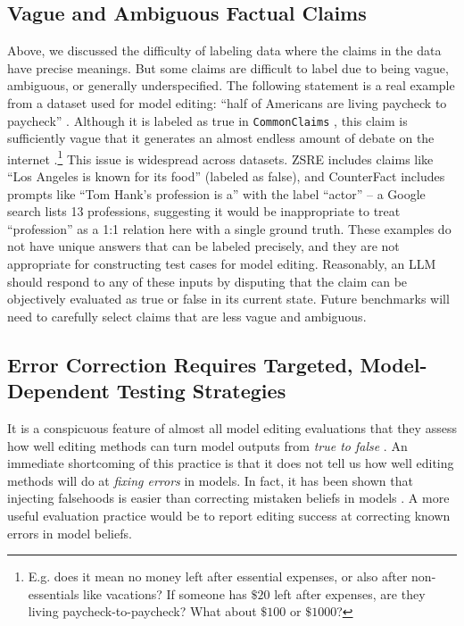 \documentclass[11pt,a4paper]{article}
\begin{document}
\subsection{Vague and Ambiguous Factual Claims}
\label{sec:vague_and_ambiguous_factual_claims}
Above, we discussed the difficulty of labeling data where the claims in the data have precise meanings. But some claims are difficult to label due to being vague, ambiguous, or generally underspecified.
The following statement is a real example from a dataset used for model editing: ``half of Americans are living paycheck to paycheck'' \citep{marks2023geometry}. Although it is labeled as true in \texttt{CommonClaims} \citep{casper2023explore}, this claim is sufficiently vague that it generates an almost endless amount of debate on the internet .\footnote{E.g. does it mean no money left after essential expenses, or also after non-essentials like vacations? If someone has $\$20$ left after expenses, are they living paycheck-to-paycheck? What about $\$100$ or $\$1000$?} 
This issue is widespread across datasets. ZSRE \citep{levy-etal-2017-zero} includes claims like ``Los Angeles is known for its food'' (labeled as false), and CounterFact \citep{meng2022locating} includes prompts like ``Tom Hank's profession is a'' with the label ``actor'' -- a Google search lists 13 professions, suggesting it would be inappropriate to treat ``profession'' as a 1:1 relation here with a single ground truth.
These examples do not have unique answers that can be labeled precisely, and they are not appropriate for constructing test cases for model editing. Reasonably, an LLM should respond to any of these inputs by disputing that the claim can be objectively evaluated as true or false in its current state. 
Future benchmarks will need to carefully select claims that are less vague and ambiguous. 

\subsection{Error Correction Requires Targeted, Model-Dependent Testing Strategies}
\label{sec:fixing_errors_makes_benchmarks_model_dependent}

It is a conspicuous feature of almost all model editing evaluations that they assess how well editing methods can turn model outputs from \emph{true to false} \citep{de2021editing, dai2021knowledge, mitchell2021fast, meng2022locating}. 
An immediate shortcoming of this practice is that it does not tell us how well editing methods will do at \emph{fixing errors} in models.
In fact, it has been shown that injecting falsehoods is easier than correcting mistaken beliefs in models \citep{hase2021language}. 
A more useful evaluation practice would be to report editing success at correcting known errors in model beliefs.
\end{document}
